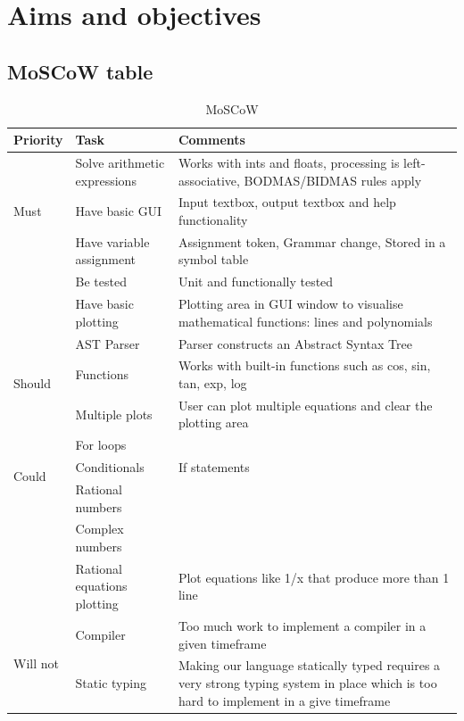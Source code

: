 \documentclass[a4paper, oneside, 11pt]{report}
\begin{document}
\chapter{Aims and objectives}
\section{MoSCoW table}
\label{appendix:moscow}
\begin{table}[h]
\caption{MoSCoW}
\begin{center}
\begin{tabular}{|p{1in}|p{2in}|p{2.5in}|} \hline
Priority & Task & Comments \\ \hline \hline
\multirow{3}{1in}{Must}
& Solve arithmetic expressions & Works with ints and floats, processing is left-associative, BODMAS/BIDMAS rules apply \\ \cline{2-3}
& Have basic GUI & Input textbox, output textbox and help functionality \\ \cline{2-3}
& Have variable assignment & Assignment token, Grammar change, Stored in a symbol table \\ \cline{2-3}
& Be tested & Unit and functionally tested \\ \cline{2-3}
& Have basic plotting & Plotting area in GUI window to visualise mathematical functions: lines and polynomials \\ \hline \hline
\multirow{3}{1in}{Should}
& AST Parser & Parser constructs an Abstract Syntax Tree \\ \cline{2-3}
& Functions & Works with built-in functions such as cos, sin, tan, exp, log  \\ \cline{2-3}
& Multiple plots & User can plot multiple equations and clear the plotting area \\ \hline \hline
\multirow{3}{1in}{Could}
& For loops & \\ \cline{2-3}
& Conditionals & If statements \\ \cline{2-3}
& Rational numbers & \\ \cline{2-3}
& Complex numbers & \\ \cline{2-3}
& Rational equations plotting & Plot equations like 1/x that produce more than 1 line \\ \hline \hline
\multirow{3}{1in}{Will not}
& Compiler & Too much work to implement a compiler in a given timeframe \\ \cline{2-3}
& Static typing & Making our language statically typed requires a very strong typing system in place which is too hard to implement in a give timeframe \\ \hline
\end{tabular}
\label{Table1}
\end{center}
\end{table}
\end{document}
